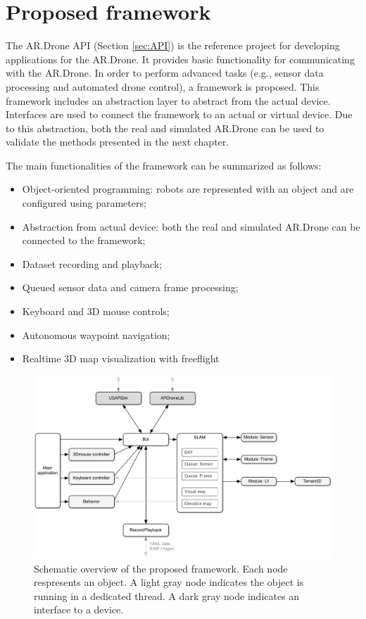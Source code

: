 \section{Proposed framework}
\label{sec:proposed-framework}
The AR.Drone API (Section \ref{sec:API}) is the reference project for developing applications for the AR.Drone.
It provides basic functionality for communicating with the AR.Drone.
In order to perform advanced tasks (e.g., sensor data processing and automated drone control), a framework is proposed.
This framework includes an abstraction layer to abstract from the actual device.
Interfaces are used to connect the framework to an actual or virtual device.
Due to this abstraction, both the real and simulated AR.Drone can be used to validate the methods presented in the next chapter.

The main functionalities of the framework can be summarized as follows:
\begin{itemize}
\item Object-oriented programming: robots are represented with an object and are configured using \mbox{parameters};
\item Abstraction from actual device: both the real and simulated AR.Drone can be connected to the framework;
\item Dataset recording and playback;
\item Queued sensor data and camera frame processing;
\item Keyboard and 3D mouse controls;
\item Autonomous waypoint navigation;
\item Realtime 3D map visualization with freeflight
\end{itemize}

\begin{figure}[htb!]
\centering
\includegraphics[width=\linewidth]{images/framework.pdf}
\caption{Schematic overview of the proposed framework. Each node respresents an object. A light gray node indicates the object is running in a dedicated thread. A dark gray node indicates an interface to a device.} 
\label{fig:proposed_framework_schematic}
\end{figure}

